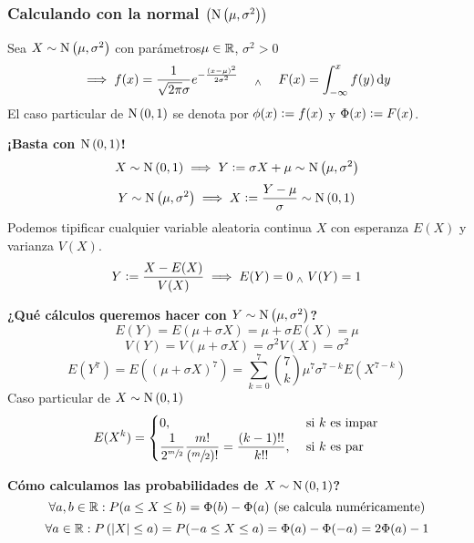 \subsubsection{Calculando con la normal $\left(\operatorname{N}\left(\mu, \sigma^2\right)\right)$}
Sea $X\sim\operatorname{N}\left(\mu, \sigma^2\right)$ con parámetros$\mu\in\mathbb{R}$, $\sigma^2>0$\
\[\implies f(x) = \frac{1}{\sqrt{2\pi}\sigma} e^{-\frac{(x-\mu)^2}{2\sigma^2}} \quad \we \quad F(x) = \int_{-\infty}^{x} f(y) \odif{y}\]
El caso particular de $\operatorname{N}\left(0, 1\right)$ se denota por $\phi(x) \vcentcolon= f(x)$ y $\Phi(x)\vcentcolon= F(x)$.
\begin{center}
\end{center}

\textbf{¡Basta con $\operatorname{N}\left(0,1\right)$!}
\[X\sim\operatorname{N}\left(0, 1\right) \implies Y\vcentcolon=\sigma X + \mu \sim \operatorname{N}\left(\mu, \sigma^2\right)\]
\[Y\sim\operatorname{N}\left(\mu, \sigma^2\right) \implies X\vcentcolon= \frac{Y-\mu}{\sigma} \sim \operatorname{N}\left(0, 1\right)\]
Podemos tipificar cualquier variable aleatoria continua $X$ con esperanza $E(X)$ y varianza $V(X)$.
\[Y\vcentcolon= \frac{X-E(X)}{V(X)} \implies E(Y) = 0 \; _{\wedge} \; V(Y) = 1\]

\textbf{¿Qué cálculos queremos hacer con $Y\sim\operatorname{N}\left(\mu, \sigma^2\right)$?}
\[E(Y) = E(\mu + \sigma X) = \mu + \sigma E(X) = \mu\]
\[V(Y) = V(\mu + \sigma X) = \sigma^2 V(X) = \sigma^2\]
\[E(Y^7) = E\left(\left(\mu + \sigma X\right)^7\right) = \sum_{k=0}^7 \binom{7}{k} \mu^7 \sigma^{7-k} E(X^{7-k})\]
Caso particular de $X\sim \operatorname{N}\left(0,1\right)$ %
\[E(X^k) = \begin{cases}
		0,                                                                                          & \text{ si } k \text{ es impar} \\
		\displaystyle \frac{1}{2^{\sfrac{m}{2}}} \frac{m!}{\left(\sfrac{m}{2}\right)!} = \frac{(k-1)!!}{k!!}, & \text{ si } k \text{ es par}
	\end{cases}\]

\textbf{Cómo calculamos las probabilidades de $X\sim\operatorname{N}\left(0,1\right)$?}
\[\forall a, b \in \mathbb{R} : P(a\leq X \leq b) = \Phi(b) - \Phi(a) \text{ (se calcula numéricamente)}\]
\[\forall a \in \mathbb{R} : P\left(\left|X\right| \leq a\right) = P(-a \leq X\leq a) = \Phi(a) - \Phi(-a) = 2\Phi(a) - 1\]

